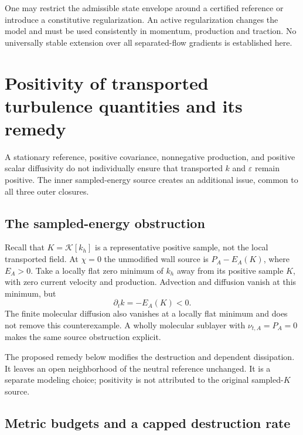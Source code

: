\documentclass[11pt,a4paper]{article}
\numberwithin{equation}{section}
\newcommand{\eps}{\varepsilon}
\begin{document}
One may restrict the admissible state envelope around a certified
reference or introduce a constitutive regularization. An active
regularization changes the model and must be used consistently in
momentum, production and traction. No universally stable extension
over all separated-flow gradients is established here.

\section{Positivity of transported turbulence quantities and its remedy}
\label{st:positivity}

A stationary reference, positive covariance, nonnegative production,
and positive scalar diffusivity do not individually ensure that
transported $k$ and $\eps$ remain positive. The inner sampled-energy
source creates an additional issue, common to all three outer
closures.

\subsection{The sampled-energy obstruction}
\label{st:sampled-obstruction}

Recall that $K=\mathcal K[k_h]$ is a representative positive sample,
not the local transported field. At $\chi=0$ the unmodified wall
source is $P_A-E_A(K)$, where $E_A>0$. Take a locally flat zero
minimum of $k_h$ away from its positive sample $K$, with zero
current velocity and production. Advection and diffusion vanish
at this minimum, but
\begin{equation}
 \partial_tk=-E_A(K)<0.
 \label{st:zero-minimum}
\end{equation}
The finite molecular diffusion also vanishes at a locally flat
minimum and does not remove this counterexample. A wholly
molecular sublayer with $\nu_{t,A}=P_A=0$ makes the same source
obstruction explicit.

The proposed remedy below modifies the destruction and dependent
dissipation. It leaves an open neighborhood of the neutral
reference unchanged. It is a separate modeling choice; positivity
is not attributed to the original sampled-$K$ source.

\subsection{Metric budgets and a capped destruction rate}
\label{st:positive-construction}
\end{document}
